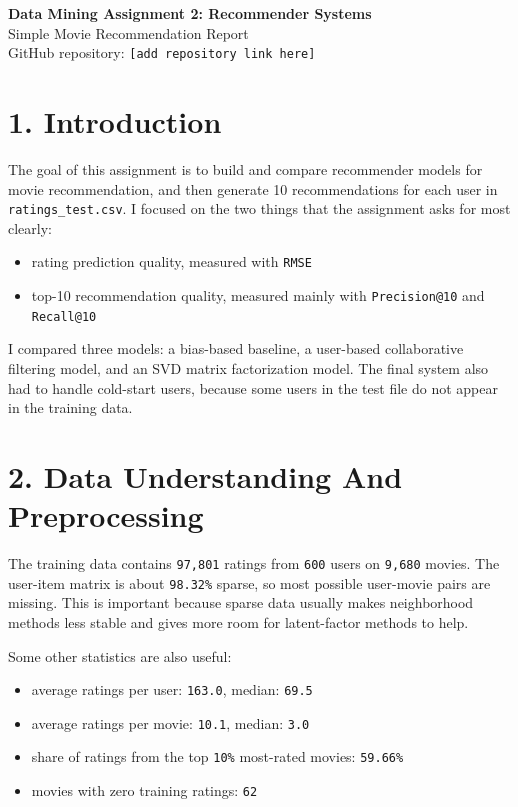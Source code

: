 \documentclass[10pt,a4paper]{article}
\begin{document}
\begin{center}
{\Large \textbf{Data Mining Assignment 2: Recommender Systems}}\\[0.4em]
\normalsize Simple Movie Recommendation Report\\[0.3em]
\small GitHub repository: \texttt{[add repository link here]}
\end{center}

\section*{1. Introduction}
The goal of this assignment is to build and compare recommender models for movie recommendation, and then generate 10 recommendations for each user in \texttt{ratings\_test.csv}. I focused on the two things that the assignment asks for most clearly:

\begin{itemize}
\item rating prediction quality, measured with \texttt{RMSE}
\item top-10 recommendation quality, measured mainly with \texttt{Precision@10} and \texttt{Recall@10}
\end{itemize}

I compared three models: a bias-based baseline, a user-based collaborative filtering model, and an SVD matrix factorization model. The final system also had to handle cold-start users, because some users in the test file do not appear in the training data.

\section*{2. Data Understanding And Preprocessing}
The training data contains \texttt{97,801} ratings from \texttt{600} users on \texttt{9,680} movies. The user-item matrix is about \texttt{98.32\%} sparse, so most possible user-movie pairs are missing. This is important because sparse data usually makes neighborhood methods less stable and gives more room for latent-factor methods to help.

Some other statistics are also useful:

\begin{itemize}
\item average ratings per user: \texttt{163.0}, median: \texttt{69.5}
\item average ratings per movie: \texttt{10.1}, median: \texttt{3.0}
\item share of ratings from the top \texttt{10\%} most-rated movies: \texttt{59.66\%}
\item movies with zero training ratings: \texttt{62}
\end{itemize}
\end{document}

